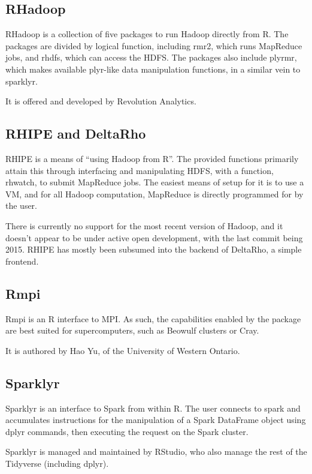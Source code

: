 \documentclass[10pt,a4paper]{article}
\begin{document}
\subsection{RHadoop}
\label{sec:rhadoop}
\nocite{analytics:_rhadoop_wiki}
RHadoop is a collection of five packages to run Hadoop directly from
R. The packages are divided by logical function, including rmr2, which
runs MapReduce jobs, and rhdfs, which can access the HDFS. The
packages also include plyrmr, which makes available plyr-like data
manipulation functions, in a similar vein to sparklyr.

It is offered and developed by Revolution Analytics.
  
\subsection{RHIPE and DeltaRho}
\label{sec:rhipe-deltarho}
\nocite{deltarho:_rhipe}
RHIPE is a means of ``using Hadoop from R''. The provided functions
primarily attain this through interfacing and manipulating HDFS, with
a function, rhwatch, to submit MapReduce jobs. The easiest means of
setup for it is to use a VM, and for all Hadoop computation, MapReduce
is directly programmed for by the user.

There is currently no support for the most recent version of Hadoop,
and it doesn't appear to be under active open development, with the
last commit being 2015. RHIPE has mostly been subsumed into the
backend of DeltaRho, a simple frontend.
  
\subsection{Rmpi}
\label{sec:rmpi}
\nocite{yu02:_rmpi}
Rmpi is an R interface to MPI. As such, the capabilities enabled by
the package are best suited for supercomputers, such as Beowulf
clusters or Cray.

It is authored by Hao Yu, of the University of Western Ontario.

\subsection{Sparklyr}
\label{sec:sparklyr}
\nocite{luraschi20}
Sparklyr is an interface to Spark from within R. The user connects to
spark and accumulates instructions for the manipulation of a Spark
DataFrame object using dplyr commands, then executing the request on
the Spark cluster.

Sparklyr is managed and maintained by RStudio, who also manage the
rest of the Tidyverse (including dplyr).
\end{document}
